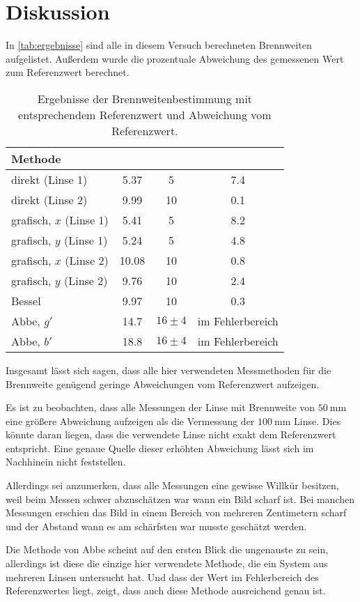 \section{Diskussion}
\label{sec:Diskussion}

In \autoref{tab:ergebnisse} sind alle in diesem Versuch berechneten Brennweiten aufgelistet. Außerdem wurde die prozentuale Abweichung des gemessenen Wert zum Referenzwert berechnet.

\begin{table}
    \centering
    \caption{Ergebnisse der Brennweitenbestimmung mit entsprechendem Referenzwert und Abweichung vom Referenzwert.}
    \begin{tabular}{l S[table-format=2.2] S[table-format=2.0] S[table-format=1.1]}
        \toprule
        Methode &  &  &  \\
        \midrule
        direkt (Linse 1) & 5.37 & 5 & 7.4 \\
        direkt (Linse 2) & 9.99 & 10 & 0.1 \\
        grafisch, $x$ (Linse 1) & 5.41 & 5 & 8.2 \\
        grafisch, $y$ (Linse 1) & 5.24 & 5 & 4.8 \\
        grafisch, $x$ (Linse 2) & 10.08 & 10  & 0.8 \\
        grafisch, $y$ (Linse 2) & 9.76 & 10 & 2.4 \\
        Bessel & 9.97 & 10 & 0.3 \\
        Abbe, $g'$ & 14.7 & {$16 \pm 4$} & {im Fehlerbereich} \\
        Abbe, $b'$ & 18.8 & {$16 \pm 4$} & {im Fehlerbereich} \\
        \bottomrule
    \end{tabular}
    \label{tab:ergebnisse}
\end{table}

Insgesamt lässt sich sagen, dass alle hier verwendeten Messmethoden für die Brennweite genügend geringe Abweichungen vom Referenzwert aufzeigen.

Es ist zu beobachten, dass alle Messungen der Linse mit Brennweite von $\SI{50}{\milli\metre}$ eine größere Abweichung aufzeigen als die Vermessung der $\SI{100}{\milli\metre}$ Linse.
Dies könnte daran liegen, dass die verwendete Linse nicht exakt dem Referenzwert entspricht.
Eine genaue Quelle dieser erhöhten Abweichung lässt sich im Nachhinein nicht feststellen.

Allerdings sei anzumerken, dass alle Messungen eine gewisse Willkür besitzen, weil beim Messen schwer abzuschätzen war wann ein Bild scharf ist. 
Bei manchen Messungen erschien das Bild in einem Bereich von mehreren Zentimetern scharf und der Abstand wann es am schärfsten war musste geschätzt werden.

Die Methode von Abbe scheint auf den ersten Blick die ungenauste zu sein, allerdings ist diese die einzige hier verwendete Methode, die ein System aus mehreren Linsen untersucht hat.
Und dass der Wert im Fehlerbereich des Referenzwertes liegt, zeigt, dass auch diese Methode ausreichend genau ist.